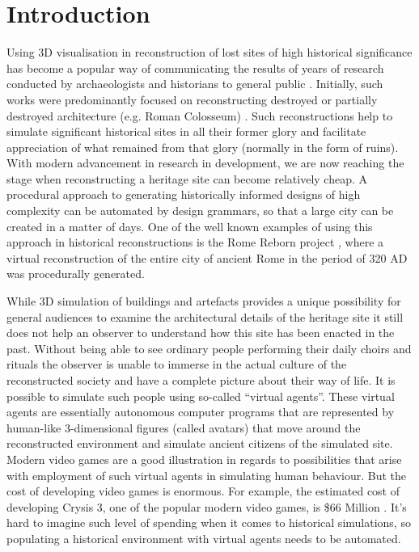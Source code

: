 \section{Introduction}
Using 3D visualisation in reconstruction of lost sites of high historical significance has become a popular way of communicating the results of years of research conducted by archaeologists and historians  to general public \cite{Heritage_trends}. Initially, such works were predominantly focused on reconstructing destroyed or partially destroyed architecture (e.g. Roman Colosseum) \cite{Colosseum_crowds}. Such reconstructions help to simulate significant historical sites in all their former glory and facilitate appreciation of what remained from that glory (normally in the form of ruins).  With modern advancement in research in development, we are now reaching the stage when reconstructing a heritage site can become relatively cheap. A procedural approach to generating historically informed designs of high complexity can be automated by design grammars, so that a large city can be created in a matter of days.  One of the well known examples of using this approach in historical reconstructions is the Rome Reborn project \cite {rome_reborn}, where a virtual reconstruction of the entire city of ancient Rome in the period of 320 AD was procedurally generated.

While 3D simulation of buildings and artefacts provides a unique possibility for general audiences to examine the architectural details of the heritage site it still does not help an observer to understand how this site has been enacted in the past. Without being able to see ordinary people performing their daily choirs and rituals the observer is unable to immerse in the actual culture of the reconstructed society and have a complete picture about their way of life. It is possible to simulate such people using so-called ``virtual agents''. These virtual agents are essentially autonomous computer programs that are represented by human-like 3-dimensional figures (called avatars) that move around the reconstructed environment and simulate ancient citizens of the simulated site.  Modern video games are a good illustration in regards to possibilities that arise with employment of such virtual agents in simulating human behaviour. But the cost of developing video games is enormous. For example, the estimated cost of developing Crysis 3, one of the popular modern video games, is \$66 Million \cite{Crysis_development_cost}. It's hard to imagine such level of spending when it comes to historical simulations, so populating a historical environment with virtual agents needs to be automated.

